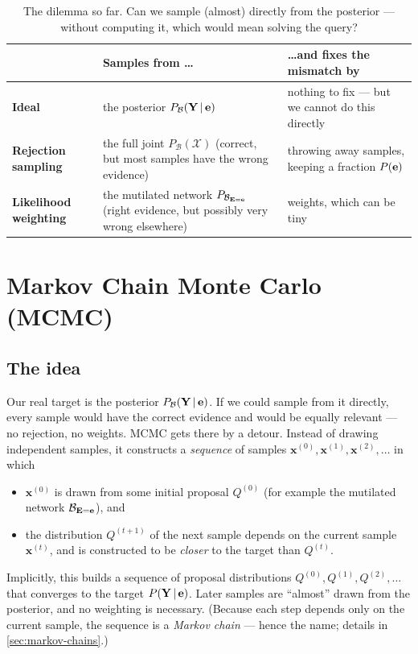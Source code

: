 \documentclass[11pt, oneside]{book}
\newcommand{\Prob}{\mathbb{P}}           %
\newcommand{\given}{\,\vert\,}           %
\newcommand{\Xall}{\mathcal{X}}          %
\newcommand{\bx}{\mathbf{x}}  \newcommand{\by}{\mathbf{y}}
\let\originalsection\section
\renewcommand{\section}{\Needspace{7\baselineskip}\originalsection}
\let\originalsubsection\subsection
\renewcommand{\subsection}{\Needspace{6\baselineskip}\originalsubsection}
\begin{document}
\begin{table}[htbp]
\centering
\small
\renewcommand{\arraystretch}{1.3}
\begin{tabular}{@{}>{\raggedright\arraybackslash}p{2.9cm}>{\raggedright\arraybackslash}p{5.6cm}>{\raggedright\arraybackslash}p{5.6cm}@{}}
\toprule
& \textbf{Samples from \ldots} & \textbf{\ldots and fixes the mismatch by} \\
\midrule
\textbf{Ideal} & the posterior $P_{\mathcal{B}}(\bY \given \be)$ & nothing to fix --- but we cannot do this directly \\
\textbf{Rejection sampling} & the full joint $P_{\mathcal{B}}(\Xall)$ (correct, but most samples have the wrong evidence) & throwing away samples, keeping a fraction $P(\mathbf{e})$ \\
\textbf{Likelihood weighting} & the mutilated network $P_{\mathcal{B}_{\mathbf{E}=\mathbf{e}}}$ (right evidence, but possibly very wrong elsewhere) & weights, which can be tiny \\
\bottomrule
\end{tabular}
\caption{The dilemma so far. Can we sample (almost) directly from the
posterior --- without computing it, which would mean solving the query?}
\label{tab:dilemma}
\end{table}

\section{Markov Chain Monte Carlo (MCMC)}
\label{sec:mcmc}

\subsection{The idea}

Our real target is the posterior $P_{\mathcal{B}}(\bY \given \be)$. If we
could sample from it directly, every sample would have the correct evidence
and would be equally relevant --- no rejection, no weights. MCMC gets there by
a detour. Instead of drawing independent samples, it constructs a
\emph{sequence} of samples $\bx^{(0)}, \bx^{(1)}, \bx^{(2)}, \ldots$ in which
\begin{itemize}
  \item $\bx^{(0)}$ is drawn from some initial proposal $Q^{(0)}$ (for
    example the mutilated network $\mathcal{B}_{\mathbf{E} = \mathbf{e}}$), and
  \item the distribution $Q^{(t+1)}$ of the next sample depends on the current
    sample $\bx^{(t)}$, and is constructed to be \emph{closer} to the target
    than $Q^{(t)}$.
\end{itemize}
Implicitly, this builds a sequence of proposal distributions $Q^{(0)},
Q^{(1)}, Q^{(2)}, \ldots$ that converges to the target $P(\bY \given \be)$.
Later samples are ``almost'' drawn from the posterior, and no weighting is
necessary. (Because each step depends only on the current sample, the
sequence is a \emph{Markov chain} --- hence the name; details in
\cref{sec:markov-chains}.)
\end{document}
